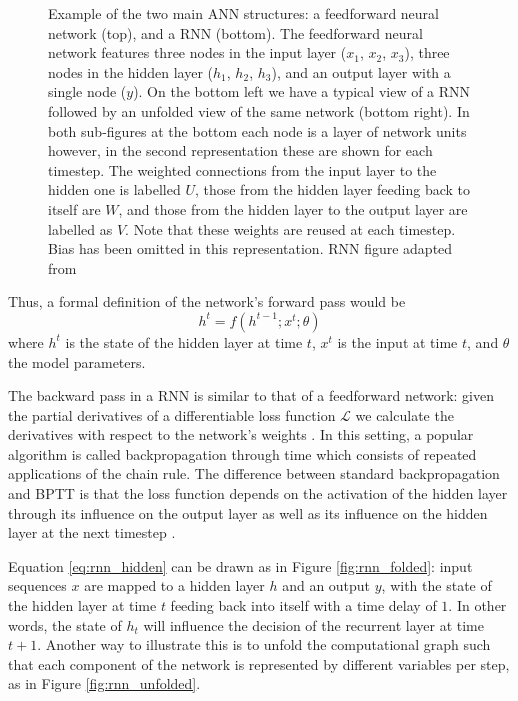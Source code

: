 \documentclass[a4paper]{book}
\begin{document}
\begin{figure}[htbp]
    \caption{Example of the two main ANN structures: a feedforward neural network (top), and a RNN (bottom). The feedforward neural network features three nodes in the input layer ($x_1$, $x_2$, $x_3$), three nodes in the hidden layer ($h_1$, $h_2$, $h_3$), and an output layer with a single node ($y$). On the bottom left we have a typical view of a RNN followed by an unfolded view of the same network (bottom right). In both sub-figures at the bottom each node is a layer of network units however, in the second representation these are shown for each timestep. The weighted connections from the input layer to the hidden one is labelled $U$, those from the hidden layer feeding back to itself are $W$, and those from the hidden layer to the output layer are labelled as $V$. Note that these weights are reused at each timestep. Bias has been omitted in this representation. RNN figure adapted from \textcite{graves_supervised_2012}}
    \label{fig:two_nets}
\end{figure}

Thus, a formal definition of the network's forward pass would be
\begin{equation}
    h^t = f(h^{t-1}; x^t; \theta) \label{eq:rnn_hidden}
\end{equation}
where $h^t$ is the state of the hidden layer at time $t$, $x^t$ is the input at time $t$, and $\theta$ the model parameters.

The backward pass in a RNN is similar to that of a feedforward network: given the partial derivatives of a differentiable loss function $\mathcal{L}$ we calculate the derivatives with respect to the network's weights \parencite{graves_supervised_2012}. In this setting, a popular algorithm is called backpropagation through time \parencite[BPTT;][]{werbos_backpropagation_1990} which consists of repeated applications of the chain rule. The difference between standard backpropagation and BPTT is that the loss function depends on the activation of the hidden layer through its influence on the output layer as well as its influence on the hidden layer at the next timestep \parencite{graves_supervised_2012}.

Equation \ref{eq:rnn_hidden} can be drawn as in Figure \ref{fig:rnn_folded}: input sequences $x$ are mapped to a hidden layer $h$ and an output $y$, with the state of the hidden layer at time $t$ feeding back into itself with a time delay of $1$. In other words, the state of $h_t$ will influence the decision of the recurrent layer at time $t+1$. Another way to illustrate this is to unfold the computational graph such that each component of the network is represented by different variables per step, as in Figure \ref{fig:rnn_unfolded}.
\end{document}
